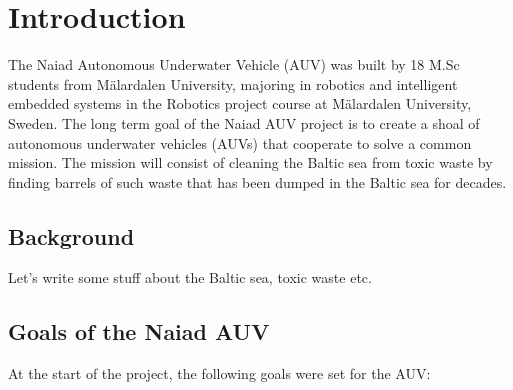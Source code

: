
\section{Introduction}\label{sec:introduction}
The Naiad Autonomous Underwater Vehicle (AUV) was built by 18 M.Sc students from M\"{a}lardalen University, majoring in robotics and intelligent embedded systems in the Robotics project course at  M\"{a}lardalen University, Sweden. \newline
The long term goal of the Naiad AUV project is to create a shoal of autonomous underwater vehicles (AUVs) that cooperate to solve a common mission. The mission will consist of cleaning the Baltic sea from toxic waste by finding barrels of such waste that has been dumped in the Baltic sea for decades. 

\subsection{Background}
Let's write some stuff about the Baltic sea, toxic waste etc.

\subsection{Goals of the Naiad AUV}
At the start of the project, the following goals were set for the AUV:


